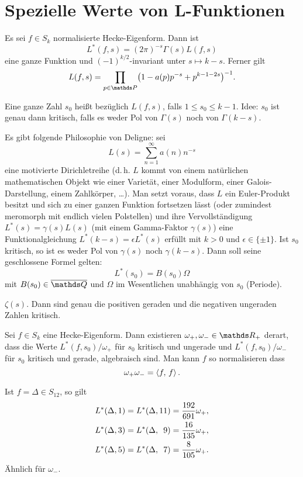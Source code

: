 \section{Spezielle Werte von L-Funktionen}

\begin{erin}
	Es sei $f \in S_k$ normalisierte Hecke-Eigenform. Dann ist
	\[
		L^*(f, s) = (2\pi)^{-s} \Gamma(s) L(f, s)
	\]
	eine ganze Funktion und $(-1)^{k/2}$-invariant unter $s \mapsto k - s$. Ferner gilt 
	\[
		L(f,s) = \prod_{p \in \PP} \bigl(1 - a(p)p^{-s} + p^{k-1-2s}\bigr)^{-1}.
	\]
\end{erin}


\begin{defi}
	Eine ganze Zahl $s_0$ heißt  bezüglich $L(f,s)$, falls $1 \leq s_0 \leq k-1$. Idee: $s_0$ ist genau dann kritisch, falls es weder Pol von $\Gamma(s)$ noch von $\Gamma(k-s)$.
\end{defi}

Es gibt folgende Philosophie von Deligne: sei 
\[
	L(s) = \sum_{n=1}^\infty a(n)n^{-s}
\]
eine \glqq{}motivierte\grqq{} Dirichletreihe (d.\,h. $L$ kommt von einem natürlichen mathematischen Objekt wie einer Varietät, einer Modulform, einer Galois-Darstellung, einem Zahlkörper, \ldots). Man setzt voraus, dass $L$ ein Euler-Produkt besitzt und sich zu einer ganzen Funktion fortsetzen lässt (oder zumindest meromorph mit endlich vielen Polstellen) und ihre Vervollständigung $L^*(s) = \gamma(s)L(s)$ (mit einem Gamma-Faktor $\gamma(s)$) eine Funktionalgleichung $L^*(k - s) = \epsilon L^*(s)$ erfüllt mit $k > 0$ und $\epsilon \in \{\pm1\}$. Ist $s_0$ kritisch, so ist es weder Pol von $\gamma(s)$ noch $\gamma(k-s)$. Dann soll seine geschlossene Formel gelten:
\[
	L^*(s_0) = B(s_0) \Omega
\]
mit $B(s_0) \in \closure{\QQ}$ und $\Omega$ \glqq{}im Wesentlichen unabhängig von $s_0$\grqq{} (\glqq Periode\grqq).

\begin{bsp}
	$\zeta(s)$. Dann sind genau die positiven geraden und die negativen ungeraden Zahlen kritisch.
\end{bsp}

\begin{satz}
	Sei $f \in S_k$ eine Hecke-Eigenform.
	Dann existieren $\omega_+, \omega_- \in \RR_+$ derart, dass die Werte $L^*(f, s_0)/\omega_+$ für $s_0$ kritisch und ungerade und $L^*(f, s_0)/\omega_-$ für $s_0$ kritisch und gerade, algebraisch sind. Man kann $f$ so normalisieren dass
	\[
		\omega_+ \omega_- = \scalarprd ff\,.
	\]
\end{satz}

\begin{bsp}
	Ist $f = \Delta \in S_{12}$, so gilt
	\begin{align*}
		L^*(\Delta, 1) &= L^*(\Delta, 11) = \frac{192}{691} \omega_+, \\
		L^*(\Delta, 3) &= L^*(\Delta, \phantom{11}\makebox[0pt][r]{9}) = \frac{16}{135} \omega_+, \\
		L^*(\Delta, 5) &= L^*(\Delta, \phantom{11}\makebox[0pt][r]{7}) = \frac{8}{105} \omega_+.
	\end{align*}
	Ähnlich für $\omega_-$.
\end{bsp}
